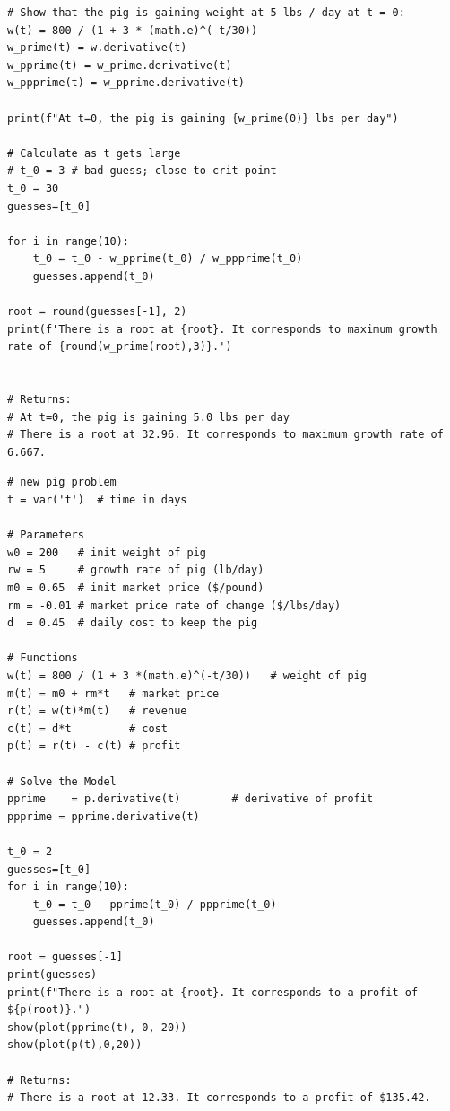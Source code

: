 \documentclass[12pt, oneside]{book}
\begin{document}
\newpage

    \label{ex:2}
    \begin{verbatim}
# Show that the pig is gaining weight at 5 lbs / day at t = 0:
w(t) = 800 / (1 + 3 * (math.e)^(-t/30))
w_prime(t) = w.derivative(t)
w_pprime(t) = w_prime.derivative(t)
w_ppprime(t) = w_pprime.derivative(t)

print(f"At t=0, the pig is gaining {w_prime(0)} lbs per day")

# Calculate as t gets large
# t_0 = 3 # bad guess; close to crit point
t_0 = 30
guesses=[t_0]

for i in range(10):
    t_0 = t_0 - w_pprime(t_0) / w_ppprime(t_0)
    guesses.append(t_0)
    
root = round(guesses[-1], 2)
print(f'There is a root at {root}. It corresponds to maximum growth rate of {round(w_prime(root),3)}.')


# Returns:
# At t=0, the pig is gaining 5.0 lbs per day
# There is a root at 32.96. It corresponds to maximum growth rate of 6.667.
    \end{verbatim}

    
\newpage



    \label{ex:3}
    \begin{verbatim}
# new pig problem
t = var('t')  # time in days

# Parameters
w0 = 200   # init weight of pig
rw = 5     # growth rate of pig (lb/day)
m0 = 0.65  # init market price ($/pound)
rm = -0.01 # market price rate of change ($/lbs/day)
d  = 0.45  # daily cost to keep the pig

# Functions
w(t) = 800 / (1 + 3 *(math.e)^(-t/30))   # weight of pig
m(t) = m0 + rm*t   # market price
r(t) = w(t)*m(t)   # revenue
c(t) = d*t         # cost
p(t) = r(t) - c(t) # profit

# Solve the Model
pprime    = p.derivative(t)        # derivative of profit
ppprime = pprime.derivative(t)

t_0 = 2
guesses=[t_0]
for i in range(10):
    t_0 = t_0 - pprime(t_0) / ppprime(t_0)
    guesses.append(t_0)

root = guesses[-1]
print(guesses)
print(f"There is a root at {root}. It corresponds to a profit of ${p(root)}.")
show(plot(pprime(t), 0, 20))
show(plot(p(t),0,20))

# Returns:
# There is a root at 12.33. It corresponds to a profit of $135.42.
    \end{verbatim}
\end{document}
